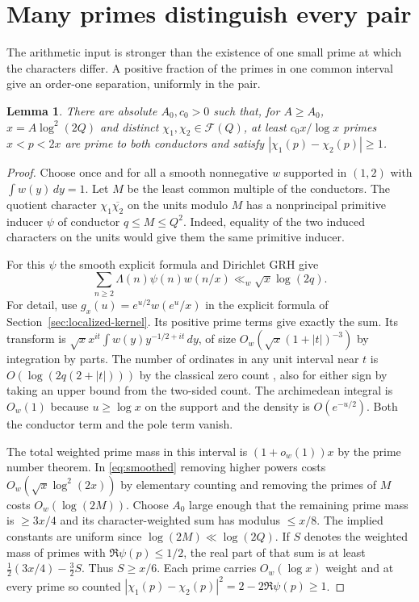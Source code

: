\documentclass[11pt]{article}
\newtheorem{lemma}[theorem]{Lemma}
\newcommand{\FQ}{\mathcal F(Q)}
\begin{document}
\section{Many primes distinguish every pair}
The arithmetic input is stronger than the existence of one small prime at which
the characters differ. A positive fraction of the primes in one common interval
give an order-one separation, uniformly in the pair.
\begin{lemma}\label{lem:witness}
There are absolute $A_0,c_0>0$ such that, for $A\ge A_0$,
$x=A\log^2(2Q)$ and distinct $\chi_1,\chi_2\in\FQ$, at least $c_0 x/\log x$
primes $x<p<2x$ are prime to both conductors and satisfy
$|\chi_1(p)-\chi_2(p)|\ge1$.
\end{lemma}
\begin{proof}
Choose once and for all a smooth nonnegative $w$ supported in $(1,2)$ with
$\int w(y)\,dy=1$. Let $M$ be the least common multiple of the conductors.
The quotient character $\chi_1\overline{\chi_2}$ on the units modulo $M$ has a
nonprincipal primitive inducer $\psi$ of conductor $q\le M\le Q^2$. Indeed, equality
of the two induced characters on the units would give them the same primitive inducer.

For this $\psi$ the smooth explicit formula and Dirichlet GRH give
\begin{equation}\label{eq:smoothed}
 \sum_{n\ge2}\Lambda(n)\psi(n)w(n/x)\ll_w \sqrt{x}\log(2q).
\end{equation}
For detail, use $g_x(u)=e^{u/2}w(e^u/x)$ in the explicit formula of
Section~\ref{sec:localized-kernel}. Its positive prime terms give exactly the sum.
Its transform is $\sqrt{x}x^{it}\int w(y)y^{-1/2+it}\,dy$, of size
$O_w(\sqrt{x}(1+|t|)^{-3})$ by integration by parts. The number of ordinates
in any unit interval near $t$ is $O(\log(2q(2+|t|)))$ by the classical zero
count \cite{bmor}, also for either sign by taking an upper bound from the two-sided
count. The archimedean integral is $O_w(1)$ because $u\ge\log x$ on the support
and the density is $O(e^{-u/2})$. Both the conductor term and the pole term vanish.

The total weighted prime mass in this interval is $(1+o_w(1))x$ by the prime
number theorem. In \eqref{eq:smoothed} removing higher powers costs
$O_w(\sqrt{x}\log^2(2x))$ by elementary counting and removing the primes of
$M$ costs $O_w(\log(2M))$. Choose $A_0$ large enough that the remaining
prime mass is $\ge 3x/4$ and its character-weighted sum has modulus $\le x/8$.
The implied constants are uniform since $\log(2M)\ll\log(2Q)$.
If $S$ denotes the weighted mass of primes with $\Re\psi(p)\le1/2$, the real
part of that sum is at least $\tfrac12(3x/4)-\tfrac32 S$.
Thus $S\ge x/6$. Each prime carries $O_w(\log x)$ weight and at every prime
so counted $|\chi_1(p)-\chi_2(p)|^2=2-2\Re\psi(p)\ge1$.
\end{proof}
\end{document}
